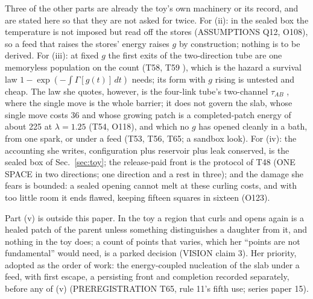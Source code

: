 \documentclass[aps,pre,10pt,twocolumn,superscriptaddress,nofootinbib]{revtex4-2}
\begin{document}
Three of the other parts are already the toy's own machinery or its record, and are stated here so that they are not
asked for twice. For (ii): in the sealed box the temperature is not imposed but read off the stores \cite{Creutz83}
(ASSUMPTIONS Q12, O108), so a feed that raises the stores' energy raises $g$ by construction; nothing is to be
derived. For (iii): at fixed $g$ the first exits of the two-direction tube are one memoryless population on the
count (T58, T59 \cite{paper1}), which is the hazard a survival law $1 - \exp(-\int \Gamma[g(t)]\,dt)$ needs; its
form with $g$ rising is untested and cheap. The law she quotes, however, is the four-link tube's two-channel
$\tau_{AB}$ \cite{paper1}, where the single move is the whole barrier; it does not govern the slab, whose single
move costs 36 and whose growing patch is a completed-patch energy of about 225 at $\lambda = 1.25$ (T54, O118), and
which no $g$ has opened cleanly in a bath, from one spark, or under a feed (T53, T56, T65; a sandbox look). For (iv):
the accounting she writes, configuration plus reservoir plus leak conserved, is the sealed box of Sec.~\ref{sec:toy};
the release-paid front is the protocol of T48 (ONE SPACE in two directions; one direction and a rest in three);
and the damage she fears is bounded: a sealed opening cannot melt at these curling costs, and with too little room
it ends flawed, keeping fifteen squares in sixteen (O123).

Part (v) is outside this paper. In the toy a region that curls and opens again is a healed patch of the parent
unless something distinguishes a daughter from it, and nothing in the toy does; a count of points that varies, which
her ``points are not fundamental'' would need, is a parked decision (VISION claim 3). Her priority, adopted as the
order of work: the energy-coupled nucleation of the slab under a feed, with first escape, a persisting front and
completion recorded separately, before any of (v) (PREREGISTRATION T65, rule 11's fifth use; series paper 15).
\end{document}
